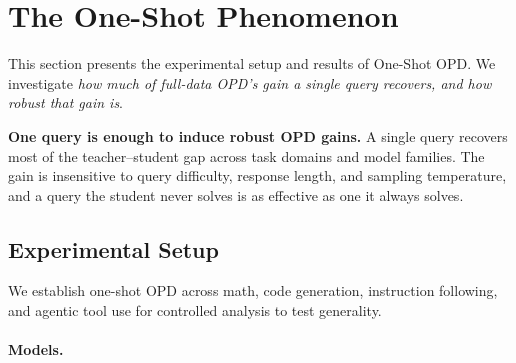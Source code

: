 \section{The One-Shot Phenomenon}
\label{sec:one-shot}

This section presents the experimental setup and results of One-Shot OPD. We investigate \textit{how much of full-data OPD's gain a single query recovers, and how robust that gain is}.

\begin{tcolorbox}[takeawaysbox]
\textbf{One query is enough to induce robust OPD gains.}
    A single query recovers most of the teacher--student gap across task domains and model families. The gain is insensitive to query difficulty, response length, and sampling temperature, and a query the student never solves is as effective as one it always solves.
\end{tcolorbox}

\subsection{Experimental Setup}
\label{sec:setup}

We establish one-shot OPD across math, code generation, instruction following, and agentic tool use for controlled analysis to test generality.

\paragraph{Models.}

